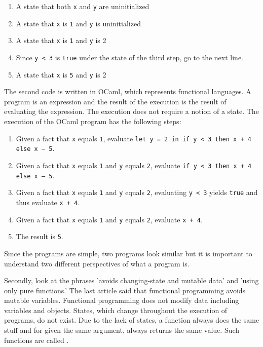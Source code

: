 \begin{enumerate}
\item A state that both \verb+x+ and \verb+y+ are uninitialized
\item A state that \verb+x+ is \verb+1+ and \verb+y+ is uninitialized
\item A state that \verb+x+ is \verb+1+ and \verb+y+ is 2
\item Since \verb+y < 3+ is \verb+true+ under the state of the third step, go to
the next line.
\item A state that \verb+x+ is \verb+5+ and \verb+y+ is 2
\end{enumerate}

The second code is written in OCaml, which represents functional languages. A
program is an expression and the result of the execution is the result of
evaluating the expression. The execution does not require a notion of a state.
The execution of the OCaml program has the following steps:

\begin{enumerate}
\item Given a fact that \verb+x+ equals \verb+1+, evaluate
\verb!let y = 2 in if y < 3 then x + 4 else x – 5!.
\item Given a fact that \verb!x! equals \verb!1! and \verb!y! equals \verb!2!,
evaluate \verb!if y < 3 then x + 4 else x – 5!.
\item Given a fact that \verb!x! equals \verb!1! and \verb!y! equals \verb!2!,
evaluating \verb!y < 3! yields \verb!true! and thus evaluate \verb!x + 4!.
\item Given a fact that \verb!x! equals \verb!1! and \verb!y! equals \verb!2!,
evaluate \verb!x + 4!.
\item The result is \verb!5!.
\end{enumerate}

Since the programs are simple, two programs look similar but it is important to
understand two different perspectives of what a program is.

Secondly, look at the phrases 'avoids changing-state and mutable data' and 'using
only pure functions.' The last article said that functional programming avoids
mutable variables. Functional programming does not modify data including
variables and objects. States, which change throughout the execution of programs,
do not exist. Due to the lack of states, a function always does the same stuff
and for given the same argument, always returns the same value. Such functions
are called .

